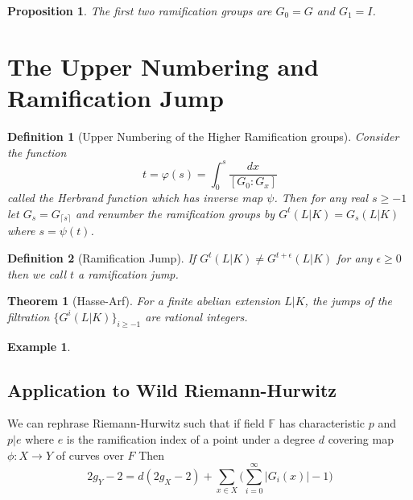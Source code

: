 \documentclass[paper=a4, fontsize=11pt]{scrartcl} %
\numberwithin{equation}{section} %
\numberwithin{figure}{section} %
\numberwithin{table}{section} %
\theoremstyle{break}
\newtheorem{defn}{Definition}
\newtheorem{thm}{Theorem}
\newtheorem{prop}{Proposition}
\newtheorem{ex}{Example}
\begin{document}
\begin{prop}
The first two ramification groups are $G_{0} = G$ and $G_{1}=I$.
\end{prop}

\section{The Upper Numbering and Ramification Jump}

\begin{defn}[Upper Numbering of the Higher Ramification groups]
Consider the function
$$
t = \varphi(s) = \int_{0}^{s} \frac{dx}{[G_0 : G_x]}
$$
called the Herbrand function which has inverse map $\psi$.
Then for any real $s \geq -1$ let $G_s = G_{\lceil s \rceil}$ and renumber the ramification groups by $G^t(L|K) = G_s(L|K)$ where $s=\psi(t)$. 
\end{defn}
\begin{defn}[Ramification Jump]
If $G^{t}(L|K) \not=G^{t+\epsilon}(L|K)$ for any $\epsilon \geq 0$ then we call $t$ a ramification jump.
\end{defn}
\begin{thm}[Hasse-Arf]
For a finite abelian extension $L|K$, the jumps of the filtration $\{G^{i}(L|K)\}_{i \geq -1}$ are rational integers.
\end{thm}
\begin{ex}
\end{ex}

\subsection{Application to Wild Riemann-Hurwitz}
We can rephrase Riemann-Hurwitz such that if field $\mathbb{F}$ has characteristic $p$ and $p|e$ where $e$ is the ramification index of a point under a degree $d$ covering map $\phi:X \to Y$ of curves over $F$
Then
$$
2g_Y -2 = d(2g_X -2) + \sum_{x\in X} \big( \sum^{\infty}_{i=0}|G_i(x)| -1 \big)
$$
\nocite{*}
\printbibliography
\end{document}
